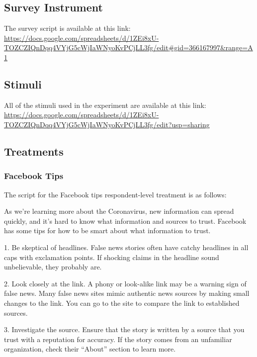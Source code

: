 \documentclass[letterpaper, 12pt, parskip=full,]{scrartcl}
\begin{document}
\subsection{Survey Instrument}\label{appendix:survey}%
The survey script is available at this link:\\
\url{https://docs.google.com/spreadsheets/d/1ZEi8xU-TOZCZIQnDqq4VYjG5cWjIaWNyoKvPCjLL3fg/edit#gid=366167997&range=A1}

\subsection{Stimuli}\label{appendis:stimuli}
All of the stimuli used in the experiment are available at this link:\\
\url{https://docs.google.com/spreadsheets/d/1ZEi8xU-TOZCZIQnDqq4VYjG5cWjIaWNyoKvPCjLL3fg/edit?usp=sharing}


\subsection{Treatments}

\subsubsection{Facebook Tips}\label{sec:fbtips}
The script for the Facebook tips respondent-level treatment is as follows:

As we're learning more about the Coronavirus, new information can spread quickly, and it's hard to know what information and sources to trust. Facebook has some tips for how to be smart about what information to trust. 

1. Be skeptical of headlines. False news stories often have catchy headlines in all caps with exclamation points. If shocking claims in the headline sound unbelievable, they probably are.

2. Look closely at the link. A phony or look-alike link may be a warning sign of false news. Many false news sites mimic authentic news sources by making small changes to the link. You can go to the site to compare the link to established sources.

3. Investigate the source. Ensure that the story is written by a source that you trust with a reputation for accuracy. If the story comes from an unfamiliar organization, check their ``About'' section to learn more.
\end{document}
